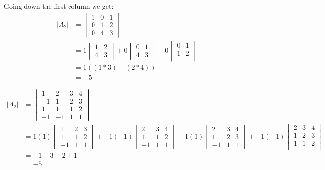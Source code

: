 \documentclass[11pt]{article}
\begin{document}
Going down the first column we get:
\begin{align*}
    |A_2| &= \begin{vmatrix}
        1 & 0 & 1 \\
    0 & 1 & 2 \\
    0 & 4 & 3
    \end{vmatrix} \\
    &= 1 \begin{vmatrix}
    1 & 2 \\
    4 & 3
    \end{vmatrix}
    + 0 \begin{vmatrix}
        0 & 1 \\
        4 & 3
    \end{vmatrix} + 0 \begin{vmatrix}
         0 & 1 \\
    1 & 2 \\
    \end{vmatrix} \\
    &= 1 ((1*3) - (2 * 4)) \\
    &= -5
\end{align*}

\begin{align*}
    |A_2| &= \begin{vmatrix}
        1 & 2 & 3 & 4\\
    -1 & 1 & 2 & 3\\
    1 & 1 & 1 & 2\\
    -1 & -1 & 1 & 1
    \end{vmatrix} \\
    &= 1 (1) \begin{vmatrix}
        1 & 2 & 3\\
        1 & 1 & 2\\
        -1 & 1 & 1
    \end{vmatrix} + -1 (-1) \begin{vmatrix}
        2 & 3 & 4\\
        1 & 1 & 2\\
        -1 & 1 & 1
    \end{vmatrix}
    + 1 (1) \begin{vmatrix}
        2 & 3 & 4\\
        1 & 2 & 3\\
        -1 & 1 & 1
    \end{vmatrix}
    + -1 (-1) \begin{vmatrix}
        2 & 3 & 4\\
        1 & 2 & 3\\
        1 & 1 & 2\\
    \end{vmatrix} \\
    &= -1 -3 -2 +1 \\
    &= -5
\end{align*}
\end{document}
